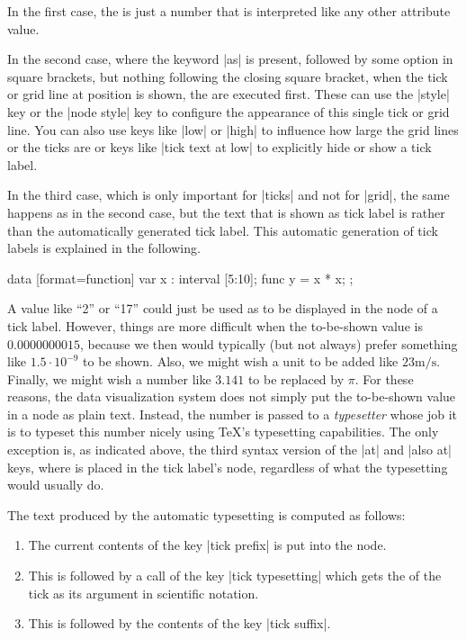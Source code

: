 In the first case, the  is just a number that is interpreted like
any other attribute value.

In the second case, where the keyword |as| is present, followed by some option
in square brackets, but nothing following the closing square bracket, when the
tick or grid line at position  is shown, the 
are executed first. These can use the |style| key or the |node style| key to
configure the appearance of this single tick or grid line. You can also use
keys like |low| or |high| to influence how large the grid lines or the ticks
are or keys like |tick text at low| to explicitly hide or show a tick label.

In the third case, which is only important for |ticks| and not for |grid|, the
same happens as in the second case, but the text that is shown as tick label is
 rather than the automatically generated tick label. This automatic
generation of tick labels is explained in the following.
%
\begin{codeexample}[preamble={\usetikzlibrary{datavisualization.formats.functions}}]
\tikz \datavisualization
  [scientific axes=clean,
   x axis={length=2.5cm, ticks={major at={
         5,
         6 as [style=red],
         7 as [{style=blue, low=-1em}],
         8 as [style=green] $2^3$,
         10 as ten
       }}},
   visualize as line]
  data [format=function] {
    var x : interval [5:10];
    func y = \value x * \value x;
  };
\end{codeexample}

A value like ``2'' or ``17'' could just be used as  to be displayed
in the node of a tick label. However, things are more difficult when the
to-be-shown value is $0.0000000015$, because we then would typically (but not
always) prefer something like $1.5 \cdot 10^{-9}$ to be shown. Also, we might
wish a unit to be added like $23\mathrm{m}/\mathrm{s}$. Finally, we might wish
a number like $3.141$ to be replaced by $\pi$. For these reasons, the data
visualization system does not simply put the to-be-shown value in a node as
plain text. Instead, the number is passed to a \emph{typesetter} whose job it
is to typeset this number nicely using \TeX's typesetting capabilities. The
only exception is, as indicated above, the third syntax version of the |at| and
|also at| keys, where  is placed in the tick label's node,
regardless of what the typesetting would usually do.

The text produced by the automatic typesetting is computed as follows:
%
\begin{enumerate}
    \item The current contents of the key |tick prefix| is put into the node.
    \item This is followed by a call of the key |tick typesetting| which gets
        the  of the tick as its argument in scientific notation.
    \item This is followed by the contents of the key |tick suffix|.
\end{enumerate}

